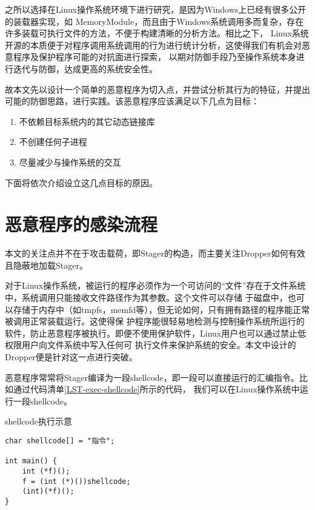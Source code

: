 之所以选择在Linux操作系统环境下进行研究，是因为Windows上已经有很多公开的装载器实现，如
MemoryModule\cite{MemModule}，而且由于Windows系统调用多而复杂，存在许多装载可执行文件的方法，不便于构建清晰的分析方法。相比之下，
Linux系统开源的本质便于对程序调用系统调用的行为进行统计分析，这使得我们有机会对恶意程序及保护程序可能的对抗面进行探索，
以期对防御手段乃至操作系统本身进行迭代与防御，达成更高的系统安全性。 

故本文先以设计一个简单的恶意程序为切入点，并尝试分析其行为的特征，并提出可能的防御思路，进行实践。该恶意程序应该满足以下几点为目标：

\begin{enumerate}
    \item 不依赖目标系统内的其它动态链接库
    \item 不创建任何子进程
    \item 尽量减少与操作系统的交互
\end{enumerate}

下面将依次介绍设立这几点目标的原因。

\section{恶意程序的感染流程}

本文的关注点并不在于攻击载荷，即Stager的构造，而主要关注Dropper如何有效且隐蔽地加载Stager。

对于Linux操作系统，被运行的程序必须作为一个可访问的“文件”存在于文件系统中，系统调用只能接收文件路径作为其参数。这个文件可以存储
于磁盘中，也可以存储于内存中（如tmpfs，memfd等），但无论如何，只有拥有路径的程序能正常被调用正常装载运行。这使得保
护程序能很轻易地检测与控制操作系统所运行的软件，防止恶意程序被执行。即便不使用保护软件，Linux用户也可以通过禁止低权限用户向文件系统中写入任何可
执行文件来保护系统的安全。本文中设计的Dropper便是针对这一点进行突破。

恶意程序常常将Stager编译为一段shellcode，即一段可以直接运行的汇编指令。比如通过代码清单\ref{LST-exec-shellcode}所示的代码，
我们可以在Linux操作系统中运行一段shellcode。

\begin{listing}
\caption{shellcode执行示意}
\label{LST-exec-shellcode}
\begin{verbatim}
char shellcode[] = "指令";

int main() {
    int (*f)();
    f = (int (*)())shellcode;
    (int)(*f)();
}
\end{verbatim}
\end{listing}


